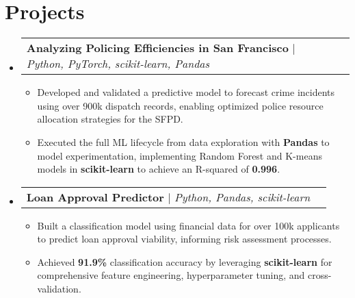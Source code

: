 \documentclass[letterpaper, 11pt]{article}
\makeatletter
\newcommand{\resumeItem}[1]{
  \item
  \small{
    {#1 \vspace{-2pt}}
  }
}
\newcommand{\resumeProjectHeading}[2]{
  \item
  \begin{tabular*}{0.97\textwidth}{l@{\extracolsep{\fill}}r}
    \small#1 & #2 \\
  \end{tabular*}
  \vspace{-7pt}
}
\newcommand{\resumeSubHeadingListStart}{
  \begin{itemize}[leftmargin=0.15in, label={}]
}
\newcommand{\resumeSubHeadingListEnd}{\end{itemize}}
\newcommand{\resumeItemListStart}{\begin{itemize}}
\newcommand{\resumeItemListEnd}{\end{itemize}\vspace{-5pt}}
\makeatother
\begin{document}
\section{Projects}
\resumeSubHeadingListStart

\resumeProjectHeading
  {\textbf{Analyzing Policing Efficiencies in San Francisco}
    $|$ \emph{Python, PyTorch, scikit-learn, Pandas}}{}
\resumeItemListStart
\resumeItem
  {Developed and validated a predictive model to forecast crime incidents using over 900k dispatch records, enabling optimized police resource allocation strategies for the SFPD.}
\resumeItem
  {Executed the full ML lifecycle from data exploration with \textbf{Pandas} to model experimentation, implementing Random Forest and K-means models in \textbf{scikit-learn} to achieve an R-squared of \textbf{0.996}.}
\resumeItemListEnd

\resumeProjectHeading
  {\textbf{Loan Approval Predictor} $|$ \emph{Python, Pandas, scikit-learn}}{}
\resumeItemListStart
\resumeItem
  {Built a classification model using financial data for over 100k applicants to predict loan approval viability, informing risk assessment processes.}
\resumeItem
  {Achieved \textbf{91.9\%} classification accuracy by leveraging \textbf{scikit-learn} for comprehensive feature engineering, hyperparameter tuning, and cross-validation.}
\resumeItemListEnd

\resumeSubHeadingListEnd

\end{document}
